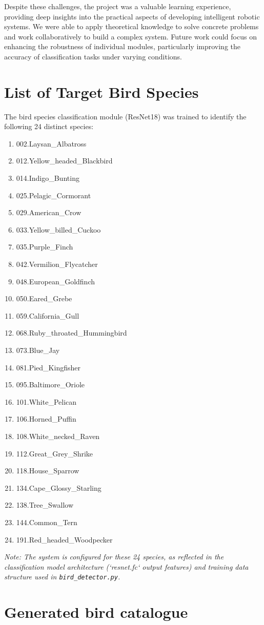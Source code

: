 \documentclass[a4paper]{article}
\begin{document}
Despite these challenges, the project was a valuable learning experience, providing deep insights into the practical aspects of developing intelligent robotic systems. We were able to apply theoretical knowledge to solve concrete problems and work collaboratively to build a complex system.
Future work could focus on enhancing the robustness of individual modules, particularly improving the accuracy of classification tasks under varying conditions.

\appendix
\section{List of Target Bird Species}
\label{appendix:birds}
The bird species classification module (ResNet18) was trained to identify the following 24 distinct species:
\begin{enumerate}
    \item 002.Laysan\_Albatross
    \item 012.Yellow\_headed\_Blackbird
    \item 014.Indigo\_Bunting
    \item 025.Pelagic\_Cormorant
    \item 029.American\_Crow
    \item 033.Yellow\_billed\_Cuckoo
    \item 035.Purple\_Finch
    \item 042.Vermilion\_Flycatcher
    \item 048.European\_Goldfinch
    \item 050.Eared\_Grebe
    \item 059.California\_Gull
    \item 068.Ruby\_throated\_Hummingbird
    \item 073.Blue\_Jay
    \item 081.Pied\_Kingfisher
    \item 095.Baltimore\_Oriole
    \item 101.White\_Pelican
    \item 106.Horned\_Puffin
    \item 108.White\_necked\_Raven
    \item 112.Great\_Grey\_Shrike
    \item 118.House\_Sparrow
    \item 134.Cape\_Glossy\_Starling
    \item 138.Tree\_Swallow
    \item 144.Common\_Tern
    \item 191.Red\_headed\_Woodpecker
\end{enumerate}
\textit{Note: The system is configured for these 24 species, as reflected in the classification model architecture (`resnet.fc` output features) and training data structure used in \texttt{bird\_detector.py}.}

\section{Generated bird catalogue}


\printbibliography
\end{document}

